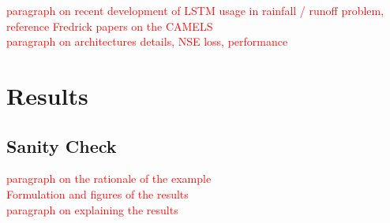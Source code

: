 \documentclass[12pt]{report}
\begin{document}
\textcolor{red}{paragraph on recent development of LSTM usage in rainfall / runoff problem, reference Fredrick papers on the CAMELS}\\

\textcolor{red}{paragraph on architectures details, NSE loss, performance}\\

\newpage






\chapter{Results} 
 
\section{Sanity Check}
\textcolor{red}{paragraph on the rationale of the example}\\

\textcolor{red}{Formulation and figures of the results}\\

\textcolor{red}{paragraph on explaining the results}\\
\newpage
\end{document}

